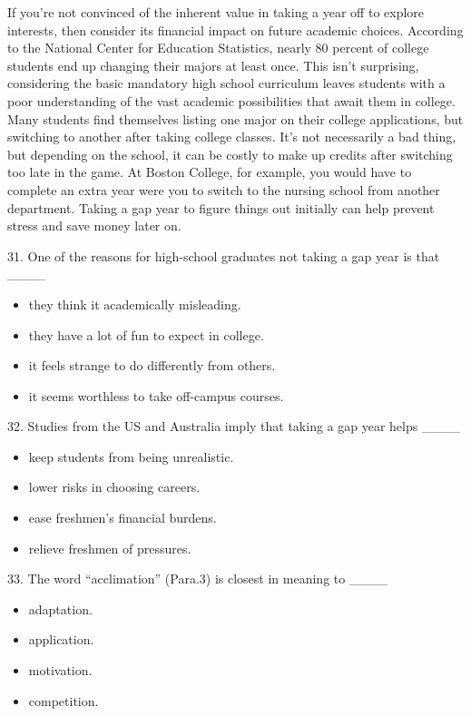\documentclass[UTF8,11pt]{ctexart}
\begin{document}
If you’re not convinced of the inherent value in taking a year off to explore interests, then consider its financial impact on future academic choices. According to the National Center for Education Statistics, nearly 80 percent of college students end up changing their majors at least once. This isn’t surprising, considering the basic mandatory high school curriculum leaves students with a poor understanding of the vast academic possibilities that await them in college. Many students find themselves listing one major on their college applications, but switching to another after taking college classes. It’s not necessarily a bad thing, but depending on the school, it can be costly to make up credits after switching too late in the game. At Boston College, for example, you would have to complete an extra year were you to switch to the nursing school from another department. Taking a gap year to figure things out initially can help prevent stress and save money later on.


31. One of the reasons for high-school graduates not taking a gap year is that \_\_\_\_


\begin{itemize}[leftmargin=2em,itemsep=.2em,topsep=.4em]\item[A.] they think it academically misleading.
\item[B.] they have a lot of fun to expect in college.
\item[C.] it feels strange to do differently from others.
\item[D.] it seems worthless to take off-campus courses.
\end{itemize}

32. Studies from the US and Australia imply that taking a gap year helps \_\_\_\_


\begin{itemize}[leftmargin=2em,itemsep=.2em,topsep=.4em]\item[A.] keep students from being unrealistic.
\item[B.] lower risks in choosing careers.
\item[C.] ease freshmen’s financial burdens.
\item[D.] relieve freshmen of pressures.
\end{itemize}

33. The word “acclimation” (Para.3) is closest in meaning to \_\_\_\_


\begin{itemize}[leftmargin=2em,itemsep=.2em,topsep=.4em]\item[A.] adaptation.
\item[B.] application.
\item[C.] motivation.
\item[D.] competition.
\end{itemize}
\end{document}

